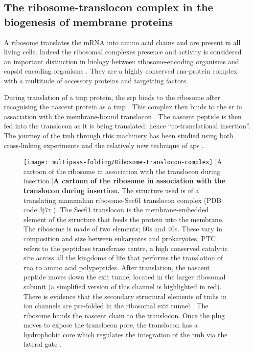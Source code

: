 \subsection{The ribosome-translocon complex in the biogenesis of membrane proteins}
A ribosome translates the mRNA into amino acid chains and are present in all living cells.
Indeed the ribosomal complexes presence and activity is considered an important distinction in biology between ribosome\--encoding organisms and capsid encoding organisms \cite{Raoult2008}.
They are a highly conserved \gls{rna}\--protein complex with a multitude of accessory proteins and targetting factors.

During translation of a \gls{tmp} protein, the \gls{srp} binds to the ribosome after recognising the nascent protein as a \gls{tmp} \cite{Walter1981}.
This complex then binds to the \gls{sr} in association with the membrane\--bound translocon \cite{Song2000}.
The nascent peptide is then fed into the translocon as it is being translated; hence ``co-translational insertion''.
The journey of the \gls{tmh} through this machinery has been studied using both  cross\--linking experiments and the relatively new technique of \gls{ap}s \cite{Cymer2015}.

\begin{figure}[!ht]
\centering
\texttt{[image: multipass-folding/Ribosome-translocon-complex]}
        [A cartoon of the ribosome in association with the translocon during insertion.]{\textbf{A cartoon of the ribosome in association with the translocon during insertion.}
        The structure used is of a translating mammalian ribosome-Sec61 translocon complex (PDB code 3j7r \cite{Voorhees2014}).
        The Sec61 translocon is the membrane\--embedded element of the structure that feeds the protein into the membrane.
        The ribosome is made of two elements; 60s and 40s.
        These vary in composition and size between eukaryotes and prokaryotes.
        PTC refers to the peptidase transferase centre, a high conserved catalytic site across all the kingdoms of life that performs the translation of \gls{rna} to amino acid polypeptides.
        After translation, the nascent peptide moves down the exit tunnel located in the larger ribosomal subunit (a simplified version of this channel is highlighted in red).
        There is evidence that the secondary structural elements of  \gls{tmh}s in ion channels are pre\--folded in the ribosomal exit tunnel \cite{Lu2005, Tu2010a, Tu2014, Kudva2018}.
        The ribosome hands the nascent chain to the translocon.
        Once the plug moves to expose the translocon pore, the translocon has a hydrophobic core which regulates the integration of the \gls{tmh} via the lateral gate \cite{Junne2010}.
}
\label{fig:Ribosome-translocon-complex}
\end{figure}


